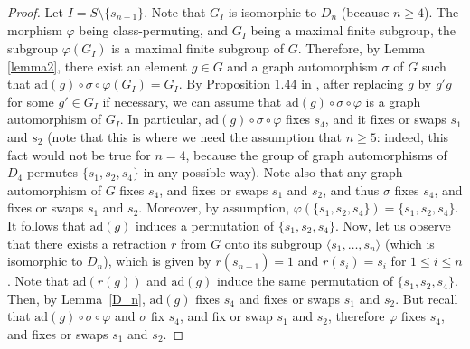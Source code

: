 \documentclass[a4paper, 11pt]{amsart}
\theoremstyle{definition}
\theoremstyle{remark}
\renewcommand{\leq}{\leqslant}
\renewcommand{\geq}{\geqslant}
\begin{document}

\begin{proof}Let $I=S\setminus \lbrace s_{n+1}\rbrace$. Note that $G_I$ is isomorphic to $D_n$ (because $n\geq 4$). The morphism $\varphi$ being class-permuting, and $G_I$ being a maximal finite subgroup, the subgroup $\varphi(G_I)$ is a maximal finite subgroup of $G$. Therefore, by Lemma \ref{lemma2}, there exist an element $g\in G$ and a graph automorphism $\sigma$ of $G$ such that $\mathrm{ad}(g)\circ \sigma \circ \varphi(G_I)=G_I$. By Proposition 1.44 in \cite{franz}, after replacing $g$ by $g'g$ for some $g'\in G_I$ if necessary, we can assume that $\mathrm{ad}(g)\circ \sigma \circ \varphi$ is a graph automorphism of $G_I$. In particular, $\mathrm{ad}(g)\circ \sigma \circ \varphi$ fixes $s_4$, and it fixes or swaps $s_1$ and $s_2$ (note that this is where we need the assumption that $n\geq 5$: indeed, this fact would not be true for $n=4$, because the group of graph automorphisms of $D_4$ permutes $\lbrace s_1,s_2,s_4\rbrace$ in any possible way). Note also that any graph automorphism of $G$ fixes $s_4$, and fixes or swaps $s_1$ and $s_2$, and thus $\sigma$ fixes $s_4$, and fixes or swaps $s_1$ and $s_2$. Moreover, by assumption, $\varphi(\lbrace s_1,s_2,s_4\rbrace)=\lbrace s_1,s_2,s_4\rbrace$. It follows that $\mathrm{ad}(g)$ induces a permutation of $\lbrace s_1,s_2,s_4\rbrace$. Now, let us observe that there exists a retraction $r$ from $G$ onto its subgroup $\langle s_1,\ldots,s_n\rangle$ (which is isomorphic to $D_n$), which is given by $r(s_{n+1})=1$ and $r(s_i)=s_i$ for $1\leq i\leq n$. Note that $\mathrm{ad}(r(g))$ and $\mathrm{ad}(g)$ induce the same permutation of $\lbrace s_1,s_2,s_4\rbrace$. Then, by Lemma~\ref{D_n}, $\mathrm{ad}(g)$ fixes $s_4$ and fixes or swaps $s_1$ and $s_2$. But recall that $\mathrm{ad}(g)\circ \sigma \circ \varphi$ and $\sigma$ fix $s_4$, and fix or swap $s_1$ and $s_2$, therefore $\varphi$ fixes $s_4$, and fixes or swaps $s_1$ and $s_2$.
\end{proof}
\end{document}
